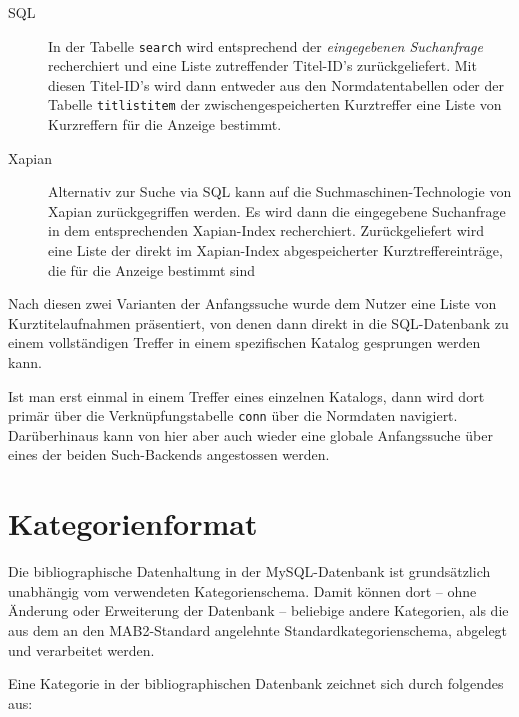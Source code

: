 \documentclass[11pt, twoside, a4paper, BCOR8mm, DIV12, bibtotoc,idxtotoc]{scrbook}
\begin{document}
\begin{description}
\item[SQL] In der Tabelle \texttt{search} wird entsprechend der
  \emph{eingegebenen Suchanfrage} recherchiert und eine Liste
  zutreffender Titel-ID's zurückgeliefert. Mit diesen Titel-ID's
  wird dann entweder aus den Normdatentabellen oder der Tabelle
  \texttt{titlistitem} der
  zwischengespeicherten Kurz\-treffer  eine Liste
  von Kurzreffern für die Anzeige bestimmt.
\item[Xapian] Alternativ zur Suche via SQL kann auf die
  Suchmaschinen-Technologie von Xapian zurückgegriffen werden. Es wird
  dann die eingegebene Suchanfrage in dem entsprechenden Xapian-Index
  recherchiert. Zurückgeliefert wird eine Liste der direkt im
  Xapian-Index abgespeicherter Kurztreffereinträge, die für die
  Anzeige bestimmt sind
\end{description}

Nach diesen zwei Varianten der Anfangssuche wurde dem Nutzer eine
Liste von Kurztitelaufnahmen präsentiert, von denen dann direkt in die
SQL-Datenbank zu einem vollständigen Treffer in einem spezifischen
Katalog gesprungen werden kann.

Ist man erst einmal in einem Treffer eines einzelnen Katalogs, dann
wird dort primär über die Verknüpfungstabelle \texttt{conn} über die
Normdaten navigiert. Darüberhinaus kann von hier aber auch wieder eine
globale Anfangssuche über eines der beiden Such-Backends angestossen
werden.


\section{Kategorienformat}

Die bibliographische Datenhaltung in der MySQL-Datenbank ist
grundsätzlich unabhängig vom verwendeten Kategorienschema. Damit
können dort -- ohne Änderung oder Erweiterung der Datenbank --
beliebige andere Kategorien, als die aus dem an den MAB2-Standard angelehnte
Standardkategorien\-schema, abgelegt und verarbeitet werden.

Eine Kategorie in der bibliographischen Datenbank zeichnet sich durch
folgendes aus:
\end{document}
